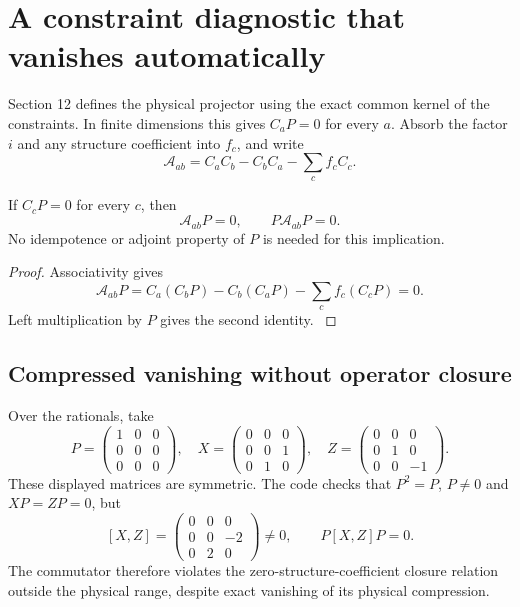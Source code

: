 \section{A constraint diagnostic that vanishes automatically}\label{supp1:section:005}
Section 12 defines the physical projector using the exact common kernel of the constraints. In finite dimensions this gives $C_aP=0$ for every $a$. Absorb the factor $i$ and any structure coefficient into $f_c$, and write
\[
\mathcal A_{ab}=C_aC_b-C_bC_a-\sum_cf_cC_c.
\]
\begin{proposition}\label{supp1:proposition:001}
If $C_cP=0$ for every $c$, then
\[
\mathcal A_{ab}P=0,\qquad P\mathcal A_{ab}P=0.
\]
No idempotence or adjoint property of $P$ is needed for this implication.
\end{proposition}
\begin{proof}\label{supp1:proof:001}
Associativity gives
\[
\mathcal A_{ab}P=C_a(C_bP)-C_b(C_aP)-\sum_cf_c(C_cP)=0.
\]
Left multiplication by $P$ gives the second identity.
\label{supp1:proof:001:end}\end{proof}

\subsection{Compressed vanishing without operator closure}
Over the rationals, take
\[
P=\begin{pmatrix}1&0&0\\0&0&0\\0&0&0\end{pmatrix},\quad
X=\begin{pmatrix}0&0&0\\0&0&1\\0&1&0\end{pmatrix},\quad
Z=\begin{pmatrix}0&0&0\\0&1&0\\0&0&-1\end{pmatrix}.
\]
These displayed matrices are symmetric. The code checks that $P^2=P$, $P\ne0$ and $XP=ZP=0$, but
\[
[X,Z]=\begin{pmatrix}0&0&0\\0&0&-2\\0&2&0\end{pmatrix}\ne0,
\qquad P[X,Z]P=0.
\]
The commutator therefore violates the zero-structure-coefficient closure relation outside the physical range, despite exact vanishing of its physical compression.



